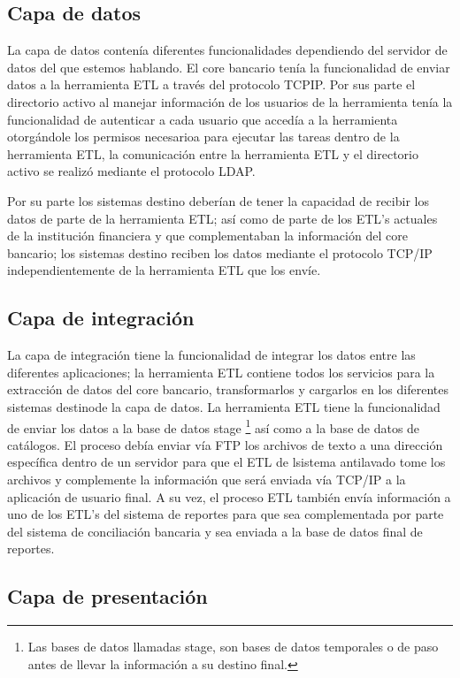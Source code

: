 \subsection{Capa de datos}

La capa de datos contenía diferentes funcionalidades dependiendo del servidor de
datos del que estemos hablando. El core bancario tenía la funcionalidad de
enviar datos a la herramienta ETL a través del protocolo TCP\/IP. Por sus parte
el directorio activo al manejar información de los usuarios de la herramienta
tenía la funcionalidad de autenticar a cada usuario que accedía a la herramienta
otorgándole los permisos necesarioa para ejecutar las tareas dentro de la
herramienta ETL, la comunicación entre la herramienta ETL y el directorio activo
se realizó mediante el protocolo LDAP.

Por su parte los sistemas destino deberían de tener la capacidad de recibir los
datos de parte de la herramienta ETL; así como de parte de los ETL's actuales de
la institución financiera y que complementaban la información del core bancario;
los sistemas destino reciben los datos mediante el protocolo TCP/IP
independientemente de la herramienta ETL que los envíe.

\subsection{Capa de integración}

La capa de integración tiene la funcionalidad de integrar los datos entre las
diferentes aplicaciones; la herramienta ETL contiene todos los servicios para la
extracción de datos del core bancario, transformarlos y cargarlos en los
diferentes sistemas destinode la capa de datos. La herramienta ETL tiene la
funcionalidad de enviar los datos a la base de datos stage \footnote{Las bases
  de datos llamadas stage, son bases de datos temporales o de paso antes de
  llevar la información a su destino final.} así como a la base de datos de
catálogos. El proceso debía enviar vía FTP los archivos de texto a una dirección
específica dentro de un servidor para que el ETL de lsistema antilavado tome los
archivos y complemente la información que será enviada vía TCP/IP a la
aplicación de usuario final. A su vez, el proceso ETL también envía información
a uno de los ETL's del sistema de reportes para que sea complementada por parte
del sistema de conciliación bancaria y sea enviada a la base de datos final de
reportes.

\subsection{Capa de presentación}

